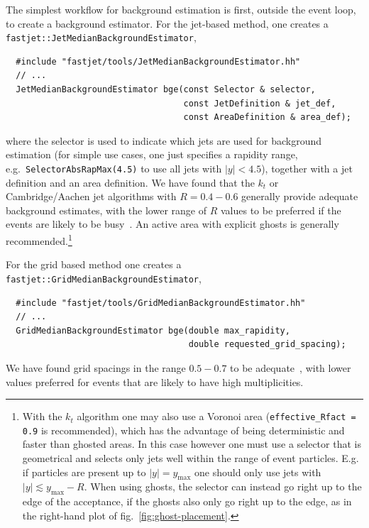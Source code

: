 \documentclass[12pt,a4]{article}
\newcommand{\ttt}[1]{{\small\texttt{#1}}}
\begin{document}
The simplest workflow for background estimation is first, outside the
event loop, to create a background estimator.
%
For the jet-based method, one creates a
\ttt{fastjet::JetMedianBackgroundEstimator},
\begin{lstlisting}
  #include "fastjet/tools/JetMedianBackgroundEstimator.hh"
  // ...
  JetMedianBackgroundEstimator bge(const Selector & selector,
                                   const JetDefinition & jet_def,
                                   const AreaDefinition & area_def);
\end{lstlisting}
where the selector is used to indicate which jets are used for
background estimation (for simple use cases, one just specifies a
rapidity range, e.g.\ \ttt{SelectorAbsRapMax(4.5)} to use all jets
with $|y|<4.5$), together with a jet definition  and an area
definition. 
%
We have found that the $k_t$ or Cambridge/Aachen jet algorithms with $R
= 0.4 - 0.6$ generally provide adequate background estimates, with
the lower range of $R$ values to be preferred if the events are likely
to be busy~\cite{Cacciari:2009dp,GridMedianLH}.
%
An active area with explicit ghosts is generally
recommended.\footnote{With the $k_t$ algorithm one may also use a
  Voronoi area (\texttt{effective\_Rfact = 0.9} is recommended), which
  has the advantage of being deterministic and faster than ghosted
  areas. In this case however one must use a selector that is
  geometrical and selects only jets well within the range of event
  particles. 
  E.g. if particles are present up to $|y| = y_{\max}$ one should only
  use jets with $|y| \lesssim y_{\max} - R$.
  When using ghosts, the selector can instead go right up
  to the edge of the acceptance, if the ghosts also only go right up
  to the edge, as in the right-hand plot of
  fig.~\ref{fig:ghost-placement}.}
%

For the grid based method one creates a
\ttt{fastjet::GridMedianBackgroundEstimator},
\begin{lstlisting}
  #include "fastjet/tools/GridMedianBackgroundEstimator.hh"
  // ...
  GridMedianBackgroundEstimator bge(double max_rapidity,
                                    double requested_grid_spacing);
\end{lstlisting}
We have found grid spacings in the range $0.5-0.7$ to be
adequate~\cite{GridMedianLH}, with lower values preferred for events
that are likely to have high multiplicities.
\end{document}
